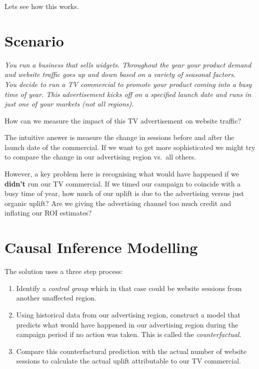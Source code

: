 \documentclass[]{book}
\providecommand{\tightlist}{%
  \setlength{\itemsep}{0pt}\setlength{\parskip}{0pt}}
\begin{document}
Lets see how this works.

\hypertarget{scenario}{%
\section{Scenario}\label{scenario}}

\emph{You run a business that sells widgets. Throughout the year your product demand
and website traffic goes up and down based on a variety of seasonal factors.\\
You decide to run a TV commercial to promote your product coming into a busy
time of year. This advertisement kicks off on a specified launch date and runs
in just one of your markets (not all regions).}

How can we measure the impact of this TV advertisement on website traffic?

The intuitive answer is measure the change in sessions before and after the launch
date of the commercial. If we want to get more sophisticated we might try
to compare the change in our advertising region vs.~all others.

However, a key problem here is recognising what would have happened if we
\textbf{didn't} run our TV commercial. If we timed our campaign to coincide with a
busy time of year, how much of our uplift is due to the advertising versus
just organic uplift? Are we giving the advertising channel too much credit and
inflating our ROI estimates?

\hypertarget{causal-inference-modelling}{%
\section{Causal Inference Modelling}\label{causal-inference-modelling}}

The solution uses a three step process:

\begin{enumerate}
\def\labelenumi{\arabic{enumi})}
\tightlist
\item
  Identify a \emph{control group} which in that case could be website sessions from
  another unaffected region.
\item
  Using historical data from our advertising region, construct a model that
  predicts what would have happened in our advertising region during the campaign
  period if no action was taken. This is called the \emph{counterfactual}.
\item
  Compare this counterfactural prediction with the actual number of website
  sessions to calculate the actual uplift attributable to our TV commercial.
\end{enumerate}
\end{document}
